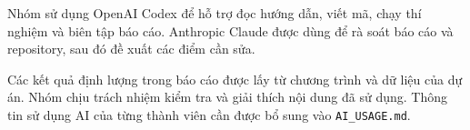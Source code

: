 Nhóm sử dụng OpenAI Codex để hỗ trợ đọc hướng dẫn, viết mã, chạy thí nghiệm và biên tập báo cáo. Anthropic Claude được dùng để rà soát báo cáo và repository, sau đó đề xuất các điểm cần sửa.

Các kết quả định lượng trong báo cáo được lấy từ chương trình và dữ liệu của dự án. Nhóm chịu trách nhiệm kiểm tra và giải thích nội dung đã sử dụng. Thông tin sử dụng AI của từng thành viên cần được bổ sung vào \texttt{AI\_USAGE.md}.
